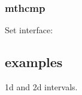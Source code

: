\subsubsection{mthcmp}

Set interface:


%   
%   
% 
% 
% 
% 
% 
% 
 
\subsection{examples}
 
1d and 2d intervals.
 
